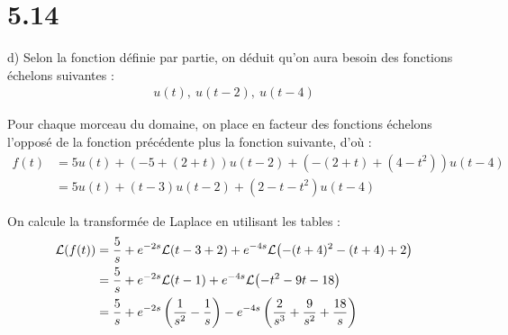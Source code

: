 \section*{5.14}

d) Selon la fonction définie par partie, on déduit qu'on aura besoin des
fonctions échelons suivantes :
\begin{align*}
    u(t),\ u(t-2),\ u(t-4)
\end{align*}

Pour chaque morceau du domaine, on place en facteur des fonctions échelons
l'opposé de la fonction précédente plus la fonction suivante, d'où :
\begin{align*}
    f(t) &= 5u(t) + (-5+(2+t))u(t-2) + (-(2+t) + (4-t^2))u(t-4) \\
    &= 5u(t) + (t-3)u(t-2) + (2-t-t^2)u(t-4)
\end{align*}

On calcule la transformée de Laplace en utilisant les tables :
\begin{align*}
    \mathcal{L}{\left({f(t)}\right)} &= \dfrac{5}{s} + e^{-2s}\mathcal{L}{\left({t-3+2}\right)}
    + e^{-4s}\mathcal{L}{\left({-(t+4)^2 -(t+4) + 2}\right)} \\
    &= \dfrac{5}{s} + e^{-2s}\mathcal{L}{\left({t-1}\right)}
    + e^{-4s}\mathcal{L}{\left({-t^2 - 9t -18}\right)} \\
    &= \dfrac{5}{s} + e^{-2s}\left({\dfrac{1}{s^2} - \dfrac{1}{s}}\right) - e^{-4s}
    \left({\dfrac{2}{s^3} + \dfrac{9}{s^2} + \dfrac{18}{s}}\right)
\end{align*}
